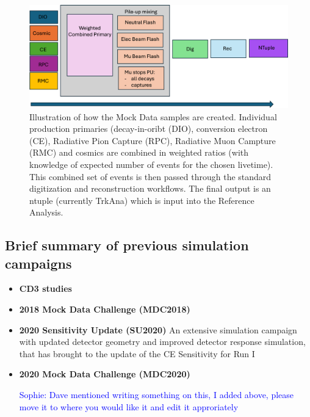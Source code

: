  \begin{figure}[htb]
\begin{center}
\includegraphics[width=0.7\linewidth]{figures/ensemblesMD0.png}
\caption{Illustration of how the Mock Data samples are created. Individual  production primaries (decay-in-oribt (DIO), conversion electron (CE), Radiative Pion Capture (RPC), Radiative Muon Campture (RMC) and cosmics are combined in weighted ratios (with knowledge of expected number of events for the chosen livetime). This combined set of events is then passed through the standard digitization and reconstruction workflows. The final output is an ntuple (currently TrkAna) which is input into the Reference Analysis.}
\label{fig:mockdata}
\end{center}
\end{figure}


\subsection{ Brief summary of previous simulation campaigns}

\begin{itemize}
\item {\bf CD3 studies}


\item {\bf 2018 Mock Data Challenge (MDC2018)}

\item {\bf 2020 Sensitivity Update (SU2020)}
An extensive simulation campaign with updated detector geometry and improved detector response simulation, that has brought to the update of the CE Sensitivity for Run I \cite{SU2020:2023}


\item {\bf 2020 Mock Data Challenge (MDC2020)}

 \textcolor{blue}{Sophie: Dave mentioned writing something on this, I added above, please move it to where you would like it and edit it approriately }
\end{itemize}